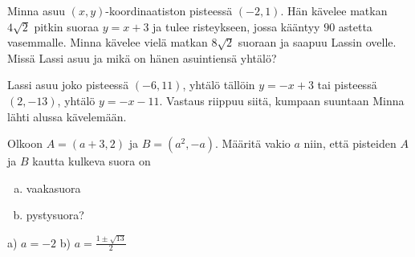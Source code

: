\begin {tehtava}
Minna asuu $(x,y)$-koordinaatiston pisteessä $(-2,1)$. Hän kävelee matkan $4\sqrt{2}$ pitkin suoraa $y=x+3$ ja tulee risteykseen, jossa kääntyy $90$ astetta vasemmalle. Minna kävelee vielä matkan $8\sqrt{2}$ suoraan ja saapuu Lassin ovelle. Missä Lassi asuu ja mikä on hänen asuintiensä yhtälö?
\begin {vastaus}
Lassi asuu joko pisteessä $(-6,11)$, yhtälö tällöin $y=-x+3$ tai pisteessä $(2,-13)$, yhtälö $y=-x-11$. Vastaus riippuu siitä, kumpaan suuntaan Minna lähti alussa kävelemään.
\end {vastaus}
\end {tehtava}

\begin {tehtava}
Olkoon $A=(a+3,2)$ ja $B=(a^2,-a)$. Määritä vakio $a$ niin, että pisteiden $A$ ja $B$ kautta kulkeva suora on
\begin{enumerate} [a)]
\item vaakasuora
\item pystysuora?
\end{enumerate}
\begin {vastaus}
a) $a=-2$ b) $a=\frac{1\pm\sqrt{13}}{2} $
\end {vastaus}
\end {tehtava}
